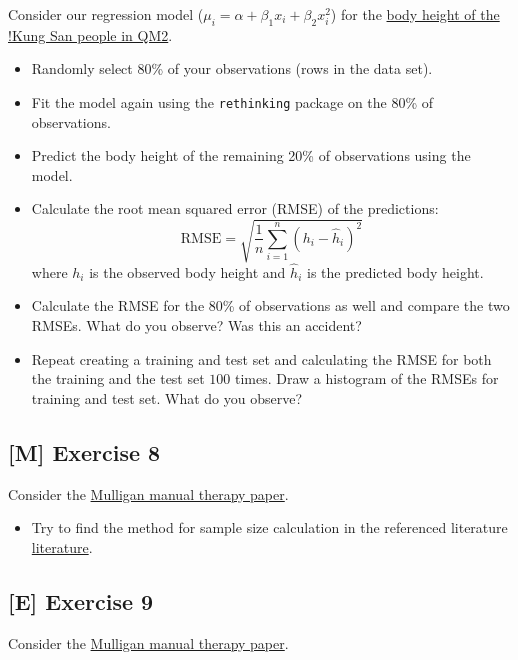 \documentclass[
]{book}
\providecommand{\tightlist}{%
  \setlength{\itemsep}{0pt}\setlength{\parskip}{0pt}}
\begin{document}
Consider our regression model (\(\mu_i = \alpha + \beta_1 x_i + \beta_2 x_i^2\))
for the \href{https://jdegenfellner.github.io/Script_QM2_ZHAW/multiple-linear-regression.html\#adding_transformed_predictor_bayes}{body height of the !Kung San people in QM2}.

\begin{itemize}
\tightlist
\item
  Randomly select 80\% of your observations (rows in the data set).
\item
  Fit the model again using the \texttt{rethinking} package on the 80\% of observations.
\item
  Predict the body height of the remaining 20\% of observations using the model.
\item
  Calculate the root mean squared error (RMSE) of the predictions:
  \[ \text{RMSE} = \sqrt{\frac{1}{n}\sum_{i=1}^n (h_i - \hat{h}_i)^2}\]
  where \(h_i\) is the observed body height and \(\hat{h}_i\) is the predicted body height.
\item
  Calculate the RMSE for the 80\% of observations as well and compare the two RMSEs.
  What do you observe? Was this an accident?
\item
  Repeat creating a training and test set and calculating the RMSE
  for both the training and the test set \(100\) times. Draw a histogram of the RMSEs for training and
  test set. What do you observe?
\end{itemize}

\subsection{{[}M{]} Exercise 8}\label{exercise8_LMM}

Consider the \hyperref[mulligan]{Mulligan manual therapy paper}.

\begin{itemize}
\tightlist
\item
  Try to find the method for sample size calculation in the
  referenced literature \href{https://journals.sagepub.com/doi/epub/10.1177/0333102417738202}{literature}.
\end{itemize}

\subsection{{[}E{]} Exercise 9}\label{exercise9_LMM}

Consider the \hyperref[mulligan]{Mulligan manual therapy paper}.
\end{document}
